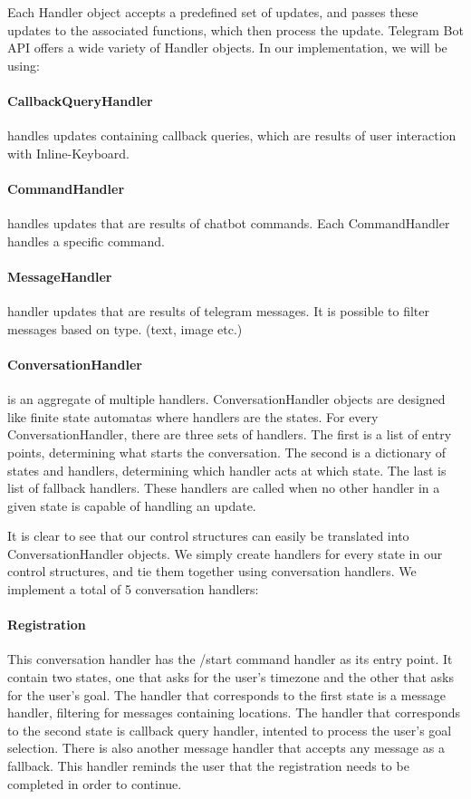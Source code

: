 Each Handler object accepts a predefined set of updates, and passes these updates to the associated functions, which then process the update.
Telegram Bot API offers a wide variety of Handler objects.
In our implementation, we will be using:

\paragraph{CallbackQueryHandler} handles updates containing callback queries, which are results of user interaction with Inline-Keyboard. 

\paragraph{CommandHandler} handles updates that are results of chatbot commands.
Each CommandHandler handles a specific command.

\paragraph{MessageHandler} handler updates that are results of telegram messages.
It is possible to filter messages based on type. (text, image etc.)

\paragraph{ConversationHandler} is an aggregate of multiple handlers. 
ConversationHandler objects are designed like finite state automatas where handlers are the states.
For every ConversationHandler, there are three sets of handlers.
The first is a list of entry points, determining what starts the conversation.
The second is a dictionary of states and handlers, determining which handler acts at which state.
The last is list of fallback handlers.
These handlers are called when no other handler in a given state is capable of handling an update.

It is clear to see that our control structures can easily be translated into ConversationHandler objects.
We simply create handlers for every state in our control structures, and tie them together using conversation handlers.
We implement a total of 5 conversation handlers:

\paragraph{Registration} This conversation handler has the /start command handler as its entry point. 
It contain two states, one that asks for the user's timezone and the other that asks for the user's goal.
The handler that corresponds to the first state is a message handler, filtering for messages containing locations.
The handler that corresponds to the second state is callback query handler, intented to process the user's goal selection.
There is also another message handler that accepts any message as a fallback.
This handler reminds the user that the registration needs to be completed in order to continue.

